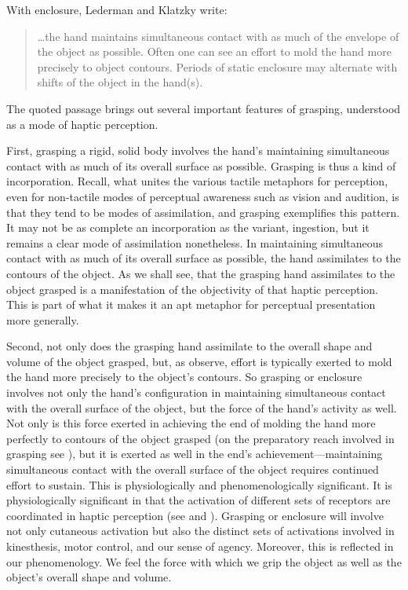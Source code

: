 With enclosure, Lederman and Klatzky write:
\begin{quote}
	\ldots the hand maintains simultaneous contact with as much of the envelope of the object as possible. Often one can see an effort to mold the hand more precisely to object contours. Periods of static enclosure may alternate with shifts of the object in the hand(s). \citep[346--7]{Lederman:1987fr}
\end{quote}
The quoted passage brings out several important features of grasping, understood as a mode of haptic perception. 

First, grasping a rigid, solid body involves the hand's maintaining simultaneous contact with as much of its overall surface as possible. Grasping is thus a kind of incorporation. Recall, what unites the various tactile metaphors for perception, even for non-tactile modes of perceptual awareness such as vision and audition, is that they tend to be modes of assimilation, and grasping exemplifies this pattern. It may not be as complete an incorporation as the variant, ingestion, but it remains a clear mode of assimilation nonetheless. In maintaining simultaneous contact with as much of its overall surface as possible, the hand assimilates to the contours of the object. As we shall see, that the grasping hand assimilates to the object grasped is a manifestation of the objectivity of that haptic perception. This is part of what it makes it an apt metaphor for perceptual presentation more generally.

Second, not only does the grasping hand assimilate to the overall shape and volume of the object grasped, but, as \citet{Lederman:1987fr} observe, effort is typically exerted to mold the hand more precisely to the object's contours. So grasping or enclosure involves not only the hand's configuration in maintaining simultaneous contact with the overall surface of the object, but the force of the hand's activity as well. Not only is this force exerted in achieving the end of molding the hand more perfectly to contours of the object grasped (on the preparatory reach involved in grasping see \citealt[chapter 6]{Jones:2006aa}), but it is exerted as well in the end's achievement---maintaining simultaneous contact with the overall surface of the object requires continued effort to sustain. This is physiologically and phenomenologically significant. It is physiologically significant in that the activation of different sets of receptors are coordinated in haptic perception (see \citealt[chapter 1]{Hatwell:2003dn} and \citealt[chapter 3, for discussion]{Fulkerson:2014ek}). Grasping or enclosure will involve not only cutaneous activation but also the distinct sets of activations involved in kinesthesis, motor control, and our sense of agency. Moreover, this is reflected in our phenomenology. We feel the force with which we grip the object as well as the object's overall shape and volume.

